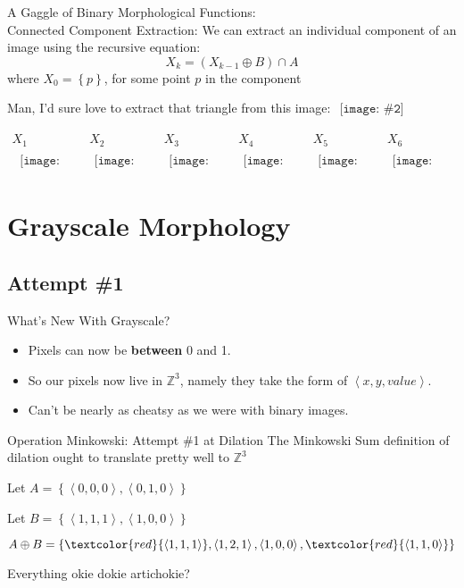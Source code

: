 \documentclass{beamer}
\newcommand{\pic}[2]{
     \begin{array}{l}
      \texttt{[image: \#2]}
      \end{array}
}
\newcommand{\bad}[1]{\textcolor{red}{#1}}
\newcommand{\set}[1]{\left\lbrace #1 \right\rbrace}
\newcommand{\tuple}[1]{\left\langle #1 \right\rangle}
\newcommand{\intersect}{\cap}
\newcommand{\dilate}{\oplus}
\begin{document}
\begin{frame}{A Gaggle of Binary Morphological Functions:\\
              Connected Component Extraction:}
   We can extract an individual component of an image using the recursive
   equation:
   $$X_k = (X_{k-1} \dilate B) \intersect A$$
     where $X_0 = \set{p}$, for some point $p$ in the component

  Man, I'd sure love to extract that triangle from this image: 
$
   \pic{width=20pt}{images/shapes.png}$

   $\begin{array}{c|c|c|c|c|c}
     X_1 & X_2 & X_3 & X_4 & X_5 & X_6\\\
     \pic{width=20pt}{images/shapes1.png}
     &\pic{width=20pt}{images/shapes2.png}
     &\pic{width=20pt}{images/shapes3.png}
     &\pic{width=20pt}{images/shapes4.png}
     &\pic{width=20pt}{images/shapes5.png}
     &\pic{width=20pt}{images/shapes6.png}
   \end{array}$

\end{frame}
              
\section{Grayscale Morphology}
\subsection{Attempt \#1}
\begin{frame}{What's New With Grayscale?}
  \begin{itemize}
    \item Pixels can now be \textbf{between} 0 and 1.
    \item So our pixels now live in $\mathbb{Z}^3$, namely
          they take the form of $\tuple{x,y,value}$.
    \item Can't be nearly as cheatsy as we were with binary images.
  \end{itemize}
\end{frame}

\begin{frame}{Operation Minkowski: Attempt \#1 at Dilation}
  The Minkowski Sum definition of dilation ought to translate pretty
        well to $\mathbb{Z}^3$ 

  Let $A = \set{\tuple{0,0,0},\tuple{0,1,0}}$

        Let $B = \set{\tuple{1,1,1},\tuple{1,0,0}}$

        $A \dilate B = \set{\bad{\tuple{1,1,1}},
                            \tuple{1,2,1},
                            \tuple{1,0,0},
                            \bad{\tuple{1,1,0}}}$

  Everything okie dokie artichokie?
\end{frame}
\end{document}

